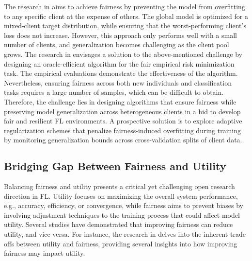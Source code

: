\documentclass{article}
\begin{document}
The research in \cite{mohri2019agnostic} aims to achieve fairness by preventing the model from overfitting to any specific client at the expense of others. The global model is optimized for a mixed-client target distribution, while ensuring that the worst-performing client's loss does not increase. However, this approach only performs well with a small number of clients, and generalization becomes challenging as the client pool grows. The research in \cite{NEURIPS2019} envisages a solution to the above-mentioned challenge by designing an oracle-efficient algorithm for the fair empirical risk minimization task. The empirical evaluations demonstrate the effectiveness of the algorithm. Nevertheless, ensuring fairness across both new individuals and classification tasks requires a large number of samples, which can be difficult to obtain. Therefore, the challenge lies in designing algorithms that ensure fairness while preserving model generalization across heterogeneous clients in a bid to develop fair and resilient FL environments. A prospective solution is to explore adaptive regularization schemes that penalize fairness-induced overfitting during training by monitoring generalization bounds across cross-validation splits of client data.

\subsection{Bridging Gap Between Fairness and Utility}
\label{SubSec: Fairness and Utility Tradeoffs}
Balancing fairness and utility presents a critical yet challenging open research direction in FL. Utility focuses on maximizing the overall system performance, e.g., 
accuracy, efficiency, or convergence, while fairness aims to prevent biases by involving adjustment techniques to the training process that could affect model utility. Several studies have demonstrated that improving fairness can reduce utility, and vice versa. For instance, the research in \cite{Dehdashtian_2024_CVPR} delves into the inherent trade-offs between utility and fairness, providing several insights into how improving fairness may impact utility.
\end{document}
